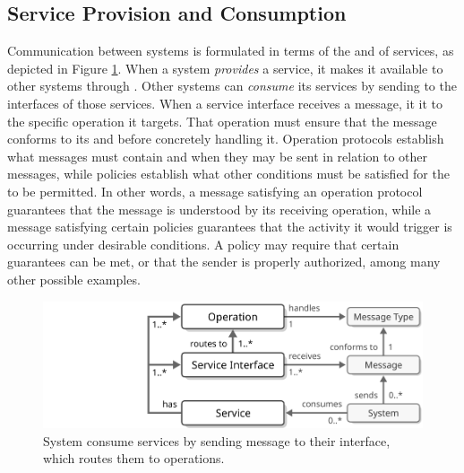   \vspace*{-3mm}

\subsection{Service Provision and Consumption}

Communication between systems is formulated in terms of the  and  of services, as depicted in Figure \ref{fig:service-consumption}.
When a system \textit{provides} a service, it makes it available to other systems through .
Other systems can \textit{consume} its services by sending  to the interfaces of those services.
When a service interface receives a message, it  it to the specific operation it targets.
That operation must ensure that the message conforms to its  and  before concretely handling it.
Operation protocols establish what messages must contain and when they may be sent in relation to other messages, while policies establish what other conditions must be satisfied for the  to be permitted.
In other words, a message satisfying an operation protocol guarantees that the message is understood by its receiving operation, while a message satisfying certain policies guarantees that the activity it would trigger is occurring under desirable conditions.
A policy may require that certain  guarantees can be met, or that the sender is properly authorized, among many other possible examples.

\begin{figure}[ht!]
  \centering
  \includegraphics[scale=0.9]{figures/service-consumption}
  \caption{
    System consume services by sending message to their interface, which routes them to operations.
  }
  \label{fig:service-consumption}
\end{figure}

